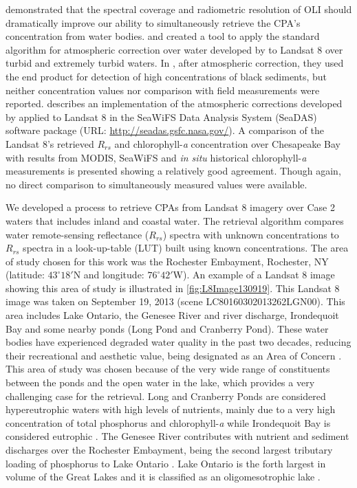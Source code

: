 \documentclass[onecolumn,3p,letterpaper,11pt]{elsarticle}
\begin{document}
\citet{Gerace:2013} demonstrated that the spectral coverage and radiometric resolution of OLI should dramatically improve our ability to simultaneously retrieve the CPA's concentration from water bodies. \citet{Vanhellemont2014} and \citet{Vanhellemont:2015} created a tool to apply the standard algorithm for atmospheric correction over water developed by \citet{Gordon:1994} to Landsat 8 over turbid and extremely turbid waters. In \citet{Vanhellemont:2015}, after atmospheric correction, they used the end product for detection of high concentrations of black sediments, but neither concentration values nor comparison with field measurements were reported. \citet{Franz:2015} describes an implementation of the atmospheric corrections developed by \citet{Gordon:1994} applied to Landsat 8 in the SeaWiFS Data Analysis System (SeaDAS) software package (URL: \url{http://seadas.gsfc.nasa.gov/}). A comparison of the Landsat 8's retrieved $R_{rs}$ and chlorophyll-{\it a} concentration over Chesapeake Bay with results from MODIS, SeaWiFS and {\it in situ} historical chlorophyll-{\it a} measurements is presented showing a relatively good agreement. Though again, no direct comparison to simultaneously measured values were available.


We developed a process to retrieve CPAs from Landsat 8 imagery over Case 2 waters that includes inland and coastal water. The retrieval algorithm compares water remote-sensing reflectance ($R_{rs}$) spectra with unknown concentrations to $R_{rs}$ spectra in a look-up-table (LUT) built using known concentrations. The area of study chosen for this work was the Rochester Embayment, Rochester, NY (latitude: $43^\circ18'$N and longitude: $76^\circ42'$W). An example of a Landsat 8 image showing this area of study is illustrated in \autoref{fig:L8Image130919}. This Landsat 8 image was taken on September 19, 2013 (scene LC80160302013262LGN00). This area includes Lake Ontario, the Genesee River and river discharge, Irondequoit Bay and some nearby ponds (Long Pond and Cranberry Pond). These water bodies have experienced degraded water quality in the past two decades, reducing their recreational and aesthetic value, being designated as an Area of Concern \citep{Makarewicz2010}. This area of study was chosen because of the very wide range of constituents between the ponds and the open water in the lake, which provides a very challenging case for the retrieval. Long and Cranberry Ponds are considered hypereutrophic waters with high levels of nutrients, mainly due to a very high concentration of total phosphorus and chlorophyll-{\it a} \citep{NYSDEC2010,Makarewicz1994} while Irondequoit Bay is considered eutrophic \citep{Makarewicz2010}. The Genesee River contributes with nutrient and sediment discharges over the Rochester Embayment, being the second largest tributary loading of phosphorus to Lake Ontario \citep{NYSDEC2015}. Lake Ontario is the forth largest in volume of the Great Lakes and it is classified as an oligomesotrophic lake \citep{IJC1980}. 
\end{document}

